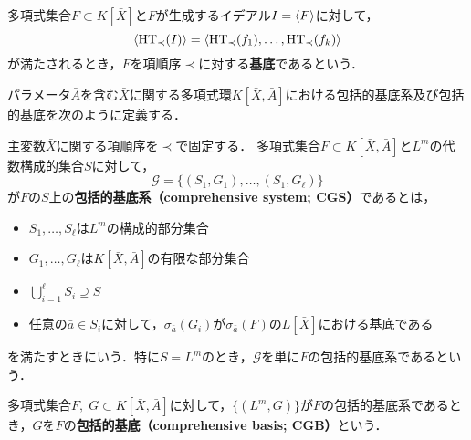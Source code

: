 \begin{definition}[\groebner{}基底]
	多項式集合$F \subset K[\bar{X}]$と$F$が生成するイデアル$I = \langle F \rangle$に対して，
	$$\langle \mathrm{HT}_\prec(I) \rangle = \langle \mathrm{HT}_\prec(f_1), \dots, \mathrm{HT}_\prec(f_k) \rangle$$
	が満たされるとき，$F$を項順序$\prec$に対する\textbf{\groebner{}基底}であるという．
\end{definition}
パラメータ$\bar{A}$を含む$\bar{X}$に関する多項式環$K[\bar{X}, \bar{A}]$における包括的\groebner{}基底系及び包括的\groebner{}基底を次のように定義する．
\nocite{鈴木晃2007グレブナー基底を用いた包括的グレブナー基底計算}
\begin{definition}
	主変数$\bar{X}$に関する項順序を$\prec$で固定する．
	多項式集合$F \subset K[\bar{X}, \bar{A}]$と$L^m$の代数構成的集合$S$に対して，
	$$\mathcal{G} = \{(S_1, G_1), \dots, (S_1, G_\ell)\}$$
	が$F$の$S$上の\textbf{包括的\groebner{}基底系（comprehensive \groebner{} system; CGS）}であるとは，
	\begin{itemize}
		\item $S_1, \dots, S_\ell$は$L^m$の構成的部分集合
		\item $G_1, \dots, G_\ell$は$K[\bar{X}, \bar{A}]$の有限な部分集合
		\item $\displaystyle \bigcup_{i=1}^{\ell} S_i \supseteq S$
		\item 任意の$\bar{a} \in S_i$に対して，$\sigma_{\bar{a}}(G_i)$が$\sigma_{\bar{a}}(F)$の$L[\bar{X}]$における\groebner{}基底である
	\end{itemize}
	を満たすときにいう．特に$S = L^m$のとき，$\mathcal{G}$を単に$F$の包括的\groebner{}基底系であるという．
\end{definition}

\begin{definition}
	多項式集合$F,\; G \subset K[\bar{X}, \bar{A}]$に対して，$\{(L^m, G)\}$が$F$の包括的\groebner{}基底系であるとき，$G$を$F$の\textbf{包括的\groebner{}基底（comprehensive \groebner{} basis; CGB）}という．
\end{definition}






